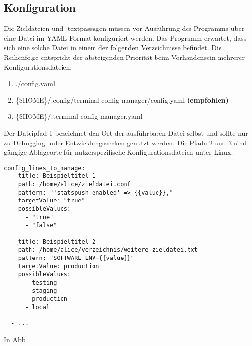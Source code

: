 \subsection{Konfiguration}
Die Zieldateien und -textpassagen müssen vor Ausführung des Programms
über eine Datei im YAML-Format konfiguriert werden.
Das Programm erwartet, dass sich eine solche Datei in einem der folgenden
Verzeichnisse befindet. Die Reihenfolge entspricht der absteigenden Priorität
beim Vorhandensein mehrerer Konfigurationsdateien:

\begin{enumerate}
	\item ./config.yaml
	\item \{\$HOME\}/.config/terminal-config-manager/config.yaml \textbf{(empfohlen)}
	\item \{\$HOME\}/.terminal-config-manager.yaml
\end{enumerate}

Der Dateipfad 1 bezeichnet den Ort der ausführbaren Datei selbst und sollte nur
zu Debugging- oder Entwicklungszecken genutzt werden. Die Pfade 2 und 3 sind
gängige Ablageorte für nutzerspezifische Konfigurationsdateien unter Linux.

\begin{verbatim}
config_lines_to_manage:
  - title: Beispieltitel 1
    path: /home/alice/zieldatei.conf
    pattern: "'statspush_enabled' => {{value}},"
    targetValue: "true"
    possibleValues:
      - "true"
      - "false"

  - title: Beispieltitel 2
    path: /home/alice/verzeichnis/weitere-zieldatei.txt
    pattern: "SOFTWARE_ENV={{value}}"
    targetValue: production
    possibleValues:
      - testing
      - staging
      - production
      - local

  - ...
\end{verbatim}

In Abb